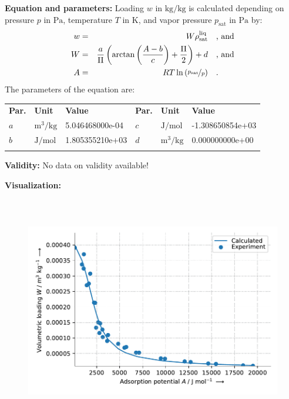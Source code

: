 \textbf{Equation and parameters:}
\newline
%
Loading $w$ in $\si{\kilogram\per\kilogram}$ is calculated depending on pressure $p$ in $\si{\pascal}$, temperature $T$ in $\si{\kelvin}$, and vapor pressure $p_\mathrm{sat}$ in $\si{\pascal}$ by:
%
\begin{equation*}
\begin{split}
w &=& W \rho_\mathrm{sat}^{\mathrm{liq}} & \quad\text{, and} \\
W &=& \frac{a}{\Pi} \left( \arctan \left( \frac{A - b}{c} \right) + \frac{\Pi}{2}\right) + d & \quad\text{, and} \\
A &=& R T \ln \left( \nicefrac{p_\mathrm{sat}}{p} \right) & \quad\text{.} \\
\end{split}
\end{equation*}
%
The parameters of the equation are:
%
\begin{longtable}[l]{lll|lll}
\toprule
\addlinespace
\textbf{Par.} & \textbf{Unit} & \textbf{Value} &	\textbf{Par.} & \textbf{Unit} & \textbf{Value} \\
\addlinespace
\midrule
\endhead

\bottomrule
\endfoot
\bottomrule
\endlastfoot
\addlinespace

$a$ & $\si{\cubic\meter\per\kilogram}$ & 5.046468000e-04 & $c$ & $\si{\joule\per\mole}$ & -1.308650854e+03 \\
$b$ & $\si{\joule\per\mole}$ & 1.805355210e+03 & $d$ & $\si{\cubic\meter\per\kilogram}$ & 0.000000000e+00 \\

\addlinespace\end{longtable}

\textbf{Validity:}
\newline
No data on validity available!
\newline

\textbf{Visualization:}
%
\begin{figure}[!htp]
{\noindent\includegraphics[height=10cm, keepaspectratio]{figs/ads/ads_Water_silica_gel_pellet_WS_DubininArctan1_1.pdf}}
\end{figure}
%

